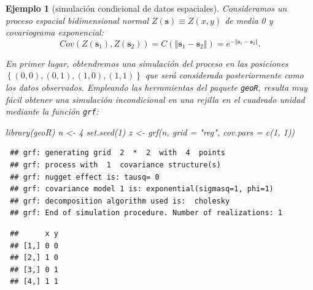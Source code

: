\documentclass[
  10pt,
]{book}
\newenvironment{Shaded}{\begin{snugshade}}{\end{snugshade}}
\newcommand{\AttributeTok}[1]{\textcolor[rgb]{0.77,0.63,0.00}{#1}}
\newcommand{\CommentTok}[1]{\textcolor[rgb]{0.56,0.35,0.01}{\textit{#1}}}
\newcommand{\DecValTok}[1]{\textcolor[rgb]{0.00,0.00,0.81}{#1}}
\newcommand{\FunctionTok}[1]{\textcolor[rgb]{0.00,0.00,0.00}{#1}}
\newcommand{\NormalTok}[1]{#1}
\newcommand{\OtherTok}[1]{\textcolor[rgb]{0.56,0.35,0.01}{#1}}
\newcommand{\SpecialCharTok}[1]{\textcolor[rgb]{0.00,0.00,0.00}{#1}}
\newcommand{\StringTok}[1]{\textcolor[rgb]{0.31,0.60,0.02}{#1}}
\renewcommand{\mathbf}[1]{\symbf{#1}}
\theoremstyle{break}
\newtheorem{example}{Ejemplo}[chapter]
\theoremstyle{nonumberplain}
\renewcommand{\CommentTok}[1]{\textcolor[rgb]{0.41,0.41,0.41}{\texttt{#1}}}
\begin{document}
\begin{example}[simulación condicional de datos espaciales]

Consideramos un proceso espacial bidimensional normal
\(Z(\mathbf{s})\equiv Z(x,y)\) de media 0 y covariograma
exponencial:
\[Cov(Z(\mathbf{s}_1),Z(\mathbf{s}_2)) 
= C(\left\Vert \mathbf{s}_1-\mathbf{s}_2\right\Vert )
= e^{-\left\Vert \mathbf{s}_1-\mathbf{s}_2\right\Vert }.\]

En primer lugar, obtendremos una simulación del proceso en las posiciones
\(\left\{(0,0),(0,1),(1,0),(1,1)\right\}\) que será considerada posteriormente
como los datos observados.
Empleando las herramientas del paquete \texttt{geoR}, resulta muy fácil obtener
una simulación incondicional en una rejilla en el cuadrado unidad
mediante la función \texttt{grf}:

\begin{Shaded}
\begin{Highlighting}[]
\FunctionTok{library}\NormalTok{(geoR)}
\NormalTok{n }\OtherTok{\textless{}{-}} \DecValTok{4}
\FunctionTok{set.seed}\NormalTok{(}\DecValTok{1}\NormalTok{)}
\NormalTok{z }\OtherTok{\textless{}{-}} \FunctionTok{grf}\NormalTok{(n, }\AttributeTok{grid =} \StringTok{"reg"}\NormalTok{, }\AttributeTok{cov.pars =} \FunctionTok{c}\NormalTok{(}\DecValTok{1}\NormalTok{, }\DecValTok{1}\NormalTok{))}
\end{Highlighting}
\end{Shaded}

\begin{verbatim}
 ## grf: generating grid  2  *  2  with  4  points
 ## grf: process with  1  covariance structure(s)
 ## grf: nugget effect is: tausq= 0 
 ## grf: covariance model 1 is: exponential(sigmasq=1, phi=1)
 ## grf: decomposition algorithm used is:  cholesky 
 ## grf: End of simulation procedure. Number of realizations: 1
\end{verbatim}

\begin{Shaded}
\end{Shaded}

\begin{verbatim}
 ##      x y
 ## [1,] 0 0
 ## [2,] 1 0
 ## [3,] 0 1
 ## [4,] 1 1
\end{verbatim}

\begin{Shaded}
\end{Shaded}


\end{example}
\end{document}
